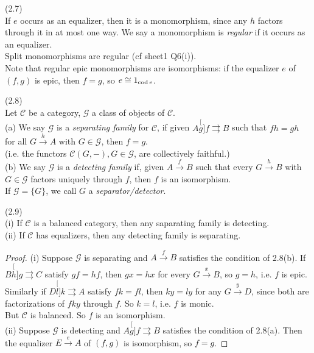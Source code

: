 \documentclass[a4paper]{article}
\begin{document}
\begin{rem} (2.7)\\
    If $e$ occurs as an equalizer, then it is a monomorphism, since any $h$ factors through it in at most one way. We say a monomorphism is \emph{regular} if it occurs as an equalizer.\\
    Split monomorphisms are regular (cf sheet1 Q6(i)).\\
    Note that regular epic monomorphisms are isomorphisms: if the equalizer $e$ of $(f,g)$ is epic, then $f=g$, so $e \cong 1_{\operatorname{cod} e}$.
\end{rem}

\begin{defi} (2.8)\\
    Let $\mathcal{C}$ be a category, $\mathcal{G}$ a class of objects of $\mathcal{C}$.\\
    (a) We say $\mathcal{G}$ is a \emph{separating family} for $\mathcal{C}$, if given $A \stackrel[g]{f}{\rightrightarrows} B$ such that $fh=gh$ for all $G \xrightarrow{h} A$ with $G \in \mathcal{G}$, then $f=g$.\\
    (i.e. the functors $\mathcal{C}(G,-),G \in \mathcal{G}$, are collectively faithful.)\\
    (b) We say $\mathcal{G}$ is a \emph{detecting family} if, given $A \xrightarrow{f} B$ such that every $G \xrightarrow{h} B$ with $G \in \mathcal{G}$ factors uniquely through $f$, then $f$ is an isomorphism.\\
    If $\mathcal{G} =\{G\}$, we call $G$ a \emph{separator/detector}.
\end{defi}

\begin{lemma} (2.9)\\
    (i) If $\mathcal{C}$ is a balanced category, then any saparating family is detecting.\\
    (ii) If $\mathcal{C}$ has equalizers, then any detecting family is separating.
    \begin{proof}
        (i) Suppose $\mathcal{G}$ is separating and $A \xrightarrow{f} B$ satisfies the condition of 2.8(b). If $B \stackrel[h]{g}{\rightrightarrows} C$ satisfy $gf=hf$, then $gx=hx$ for every $G \xrightarrow{x} B$, so $g=h$, i.e. $f$ is epic.\\
        Similarly if $D \stackrel[l]{k}{\rightrightarrows} A$ satisfy $fk=fl$, then $ky=ly$ for any $G \xrightarrow{y} D$, since both are factorizations of $fky$ through $f$. So $k=l$, i.e. $f$ is monic.\\
        But $\mathcal{C}$ is balanced. So $f$ is an isomorphism.\\
        (ii) Suppose $\mathcal{G}$ is detecting and $A \stackrel[g]{f}{\rightrightarrows} B$ satisfies the condition of 2.8(a). Then the equalizer $E \xrightarrow{e} A$ of $(f,g)$ is isomorphism, so $f=g$.
    \end{proof}
\end{lemma}
\end{document}
